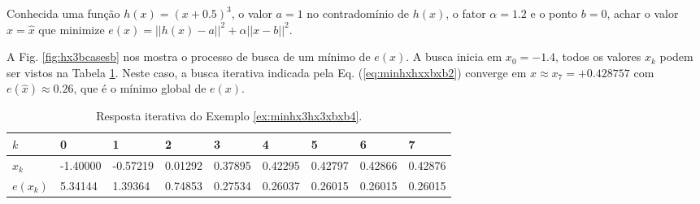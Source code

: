 \begin{example}\label{ex:minhx3hx3xbxb4}
Conhecida uma função $h(x)=(x+0.5)^3$, o valor $a=1$ no contradomínio de $h(x)$,
o fator $\alpha=1.2$ e o ponto $b=0$,
achar o valor $x=\hat{x}$ que minimize $e(x)=||h(x)-a||^2+\alpha||x-b||^2$.
\end{example}
\begin{SolutionT}\label{sol:minhx3hx3xbxb4}
 A Fig. \ref{fig:hx3bcasesb} nos mostra o processo de busca de um mínimo
 de $e(x)$. A busca inicia em $x_0=-1.4$,
 todos os valores $x_{k}$ podem ser vistos na Tabela \ref{tab:hx3bcases4}. 
Neste caso, a busca iterativa indicada pela Eq. (\ref{eq:minhxhxxbxb2}) converge 
em $\hat{x}\approx x_7=+0.428757$ com $e(\hat{x})\approx 0.26$,
que é o mínimo global de $e(x)$.

\end{SolutionT}


\begin{table}[!h]
\centering
\begin{tabular}{|l|l|l|l|l|l|l|l|l|}
\hline
$k$      & 0 & 1 & 2 & 3 & 4 & 5 & 6 & 7 \\ \hline
$x_k$    & -1.40000 & -0.57219  & 0.01292  & 0.37895  & 0.42295  & 0.42797  & 0.42866  & 0.42876 \\ \hline
$e(x_k)$ &  5.34144 &  1.39364  & 0.74853  & 0.27534  & 0.26037  & 0.26015  & 0.26015  & 0.26015 \\ \hline
\end{tabular}
\caption{Resposta iterativa do Exemplo \ref{ex:minhx3hx3xbxb4}.}
\label{tab:hx3bcases4}
\end{table}


